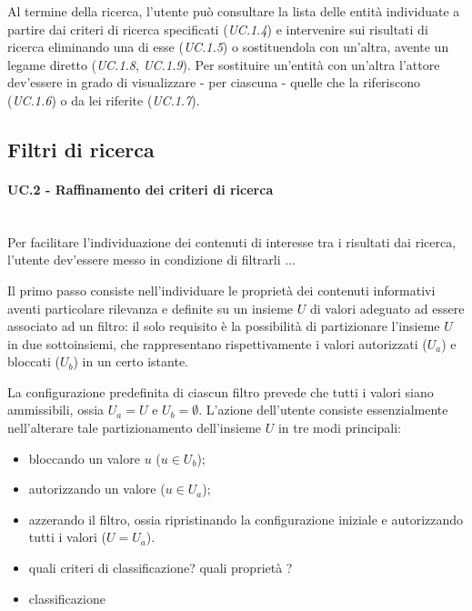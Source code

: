 Al termine della ricerca, l'utente può consultare la lista delle entità individuate a partire dai criteri di ricerca specificati (\textit{UC.1.4}) e intervenire sui risultati di ricerca eliminando una di esse (\textit{UC.1.5}) o sostituendola con un'altra, avente un legame diretto (\textit{UC.1.8}, \textit{UC.1.9}). Per sostituire un'entità con un'altra l'attore dev'essere in grado di visualizzare - per ciascuna - quelle che la riferiscono (\textit{UC.1.6}) o da lei riferite (\textit{UC.1.7}).
 
\subsection{Filtri di ricerca}

\paragraph{UC.2 - Raffinamento dei criteri di ricerca} \hfill \\
Per facilitare l'individuazione dei contenuti di interesse tra i risultati dai ricerca, l'utente dev'essere messo in condizione di filtrarli ...

Il primo passo consiste nell'individuare le proprietà dei contenuti informativi aventi particolare rilevanza e definite su un insieme $U$ di valori adeguato ad essere associato ad un filtro: il solo requisito è la possibilità di partizionare l'insieme $U$ in due sottoinsiemi, che rappresentano rispettivamente i valori autorizzati ($U_a$) e bloccati ($U_b$) in un certo istante.


La configurazione predefinita di ciascun filtro prevede che tutti i valori siano ammissibili, ossia $U_a = U$ e $U_b = \emptyset$. L'azione dell'utente consiste essenzialmente nell'alterare tale partizionamento dell'insieme $U$ in tre modi principali:
\begin{itemize}
	\item bloccando un valore $u$ ($u \in U_b$);
	\item autorizzando un valore ($u \in U_a$);
	\item azzerando il filtro, ossia ripristinando la configurazione iniziale e autorizzando tutti i valori ($U = U_a$).
\end{itemize}

\begin{itemize}
	\item quali criteri di classificazione? quali proprietà ?
	\item classificazione
\end{itemize}

